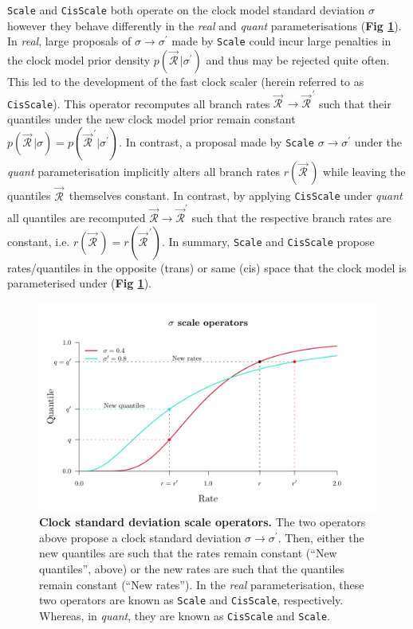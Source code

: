 \documentclass[10pt,letterpaper]{article}
\begin{document}
 \texttt{Scale} and \texttt{CisScale} both operate on the clock model standard deviation $\sigma$ however they behave differently in the \textit{real} and \textit{quant} parameterisations (\textbf{Fig \ref{fig:clockSDoperators}}).
In \textit{real}, large proposals of $\sigma \rightarrow \sigma^\prime$ made by  \texttt{Scale} could incur large penalties in the clock model prior density $p(\vec{\mathcal{R}}^{\,}|\sigma^\prime)$ and thus may be rejected quite often. 
This led to the development of the fast clock scaler \cite{zhang2020improving} (herein referred to as \texttt{CisScale}).
This operator recomputes all branch rates $\vec{\mathcal{R}}^{\,} \rightarrow \vec{\mathcal{R}}^{\, \prime}$ such that their quantiles under the new clock model prior remain constant $p(\vec{\mathcal{R}}^{\,}|\sigma) = p(\vec{\mathcal{R}}^{\, \prime}|\sigma^\prime)$.
In contrast, a proposal made by \texttt{Scale} $\sigma \rightarrow \sigma^\prime$ under the \textit{quant} parameterisation implicitly alters all branch rates $r(\vec{\mathcal{R}}^{\,})$ while leaving the quantiles $\vec{\mathcal{R}}^{\,}$ themselves constant.
In contrast, by applying \texttt{CisScale} under \textit{quant}
all quantiles are recomputed $\vec{\mathcal{R}} \rightarrow \vec{\mathcal{R}}^\prime$  such that the respective branch rates are constant, i.e. $r(\vec{\mathcal{R}}^{\,}) = r(\vec{\mathcal{R}}^{\,\prime})$.
In summary, \texttt{Scale} and \texttt{CisScale} propose rates/quantiles in the opposite (trans) or same (cis) space that the clock model is parameterised under (\textbf{Fig \ref{fig:clockSDoperators}}).




\begin{figure}[!h]
\centering
\includegraphics[width=\textwidth]{Figures/clockSD.pdf}
\caption{\textbf{Clock standard deviation scale operators.}
The two operators above propose a clock standard deviation $\sigma \rightarrow \sigma^\prime$. 
Then, either the new quantiles are such that the rates remain constant (``New quantiles'', above) or the new rates are  such that the quantiles remain constant (``New rates''). 
In the \textit{real} parameterisation, these two operators are known as \texttt{Scale} and \texttt{CisScale}, respectively.
Whereas, in \textit{quant}, they are known as \texttt{CisScale} and \texttt{Scale}.    }
\label{fig:clockSDoperators}
\end{figure}
\end{document}
